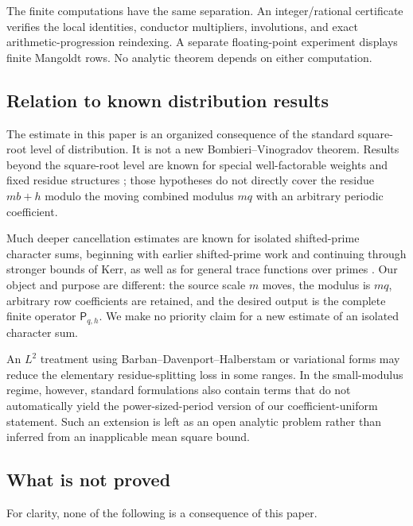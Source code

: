 The finite computations have the same separation.  An integer/rational
certificate verifies the local identities, conductor multipliers,
involutions, and exact arithmetic-progression reindexing.  A separate
floating-point experiment displays finite Mangoldt rows.  No analytic
theorem depends on either computation.

\subsection{Relation to known distribution results}

The estimate in this paper is an organized consequence of the standard
square-root level of distribution.  It is not a new
Bombieri--Vinogradov theorem.  Results beyond the square-root level are known
for special well-factorable weights and fixed residue structures
\citep{BombieriFriedlanderIwaniec1986,Maynard2025WellFactorable}; those
hypotheses do not directly cover the residue $mb+h$ modulo the moving
combined modulus $mq$ with an arbitrary periodic coefficient.

Much deeper cancellation estimates are known for isolated shifted-prime
character sums, beginning with earlier shifted-prime work and continuing
through stronger bounds of Kerr, as well as for general trace functions over
primes \citep{FriedlanderGongShparlinski2010,Kerr2021,
FouvryKowalskiMichel2014}.  Our object and purpose are different: the source
scale $m$ moves, the modulus is $mq$, arbitrary row coefficients are retained,
and the desired output is the complete finite operator $\mathsf P_{q,h}$.  We
make no priority claim for a new estimate of an isolated character sum.

An $L^2$ treatment using Barban--Davenport--Halberstam or variational forms
\citep{LewkoLewko2012} may reduce the elementary residue-splitting loss in
some ranges.  In the small-modulus regime, however, standard formulations
also contain terms that do not automatically yield the power-sized-period
version of our coefficient-uniform statement.  Such an extension is left as
an open analytic problem rather than inferred from an inapplicable mean
square bound.

\subsection{What is not proved}

For clarity, none of the following is a consequence of this paper.

